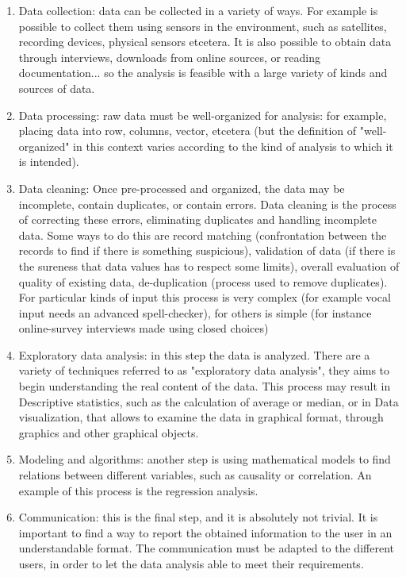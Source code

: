 \begin{enumerate}

\item Data collection: data can be collected in a variety of ways. For example is possible to collect them using sensors in the environment, such as satellites, recording devices, physical sensors etcetera. It is also possible to obtain data through interviews, downloads from online sources, or reading documentation... so the analysis is feasible with a large variety of kinds and sources of data. 

\item Data processing: raw data must be well-organized for analysis: for example, placing data into row, columns, vector, etcetera (but the definition of "well-organized" in this context varies according to the kind of analysis to which it is intended).

\item Data cleaning: Once pre-processed and organized, the data may be incomplete, contain duplicates, or contain errors. Data cleaning is the process of correcting these errors, eliminating duplicates and handling incomplete data. Some ways to do this are record matching (confrontation between the records to find if there is something suspicious), validation of data (if there is the sureness that data values has to respect some limits), overall evaluation of quality of existing data, de-duplication (process used to remove duplicates). For particular kinds of input this process is very complex (for example vocal input needs an advanced spell-checker), for others is simple (for instance online-survey interviews made using closed choices) 

\item Exploratory data analysis: in this step the data is analyzed. There are a variety of techniques referred to as "exploratory data analysis", they aims to begin understanding the real content of the data. This process may result in Descriptive statistics, such as the calculation of average or median, or in Data visualization, that allows to examine the data in graphical format, through graphics and other graphical objects.

\item Modeling and algorithms: another step is using mathematical models to find relations between different variables, such as causality or correlation. An example of this process is the regression analysis.

\item Communication: this is the final step, and it is absolutely not trivial. It is important to find a way to report the obtained information to the user in an understandable format. The communication must be adapted to the different users, in order to let the data analysis able to meet their requirements.

\end{enumerate}

